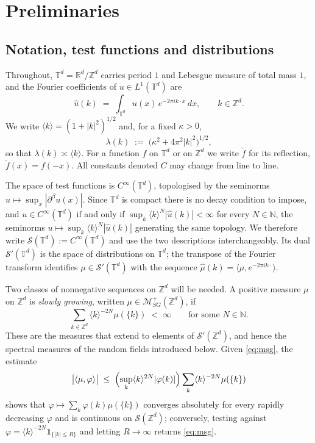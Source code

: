 \documentclass[pdflatex,sn-mathphys,Numbered]{sn-jnl}
\theoremstyle{thmstyleone}%
\theoremstyle{thmstyletwo}%
\theoremstyle{thmstylethree}%
\newcommand{\RR}{\mathbb{R}}
\newcommand{\ZZ}{\mathbb{Z}}
\newcommand{\NN}{\mathbb{N}}
\newcommand{\TT}{\mathbb{T}}
\newcommand{\calS}{\mathcal{S}}
\newcommand{\calM}{\mathcal{M}}
\begin{document}
\section{Preliminaries}
\label{sec:preliminaries}

\subsection{Notation, test functions and distributions}

Throughout, $\TT^d = \RR^d/\ZZ^d$ carries period $1$ and Lebesgue measure of
total mass $1$, and the Fourier coefficients of $u \in L^1(\TT^d)$ are
\[
    \hat u(k) \;=\; \int_{\TT^d} u(x)\, e^{-2\pi i k\cdot x}\,dx ,
    \qquad k \in \ZZ^d .
\]
We write $\langle k\rangle = (1+|k|^2)^{1/2}$ and, for a fixed $\kappa>0$,
\begin{equation}\label{eq:lambda}
    \lambda(k) \;:=\; \bigl(\kappa^2 + 4\pi^2|k|^2\bigr)^{1/2} ,
\end{equation}
so that $\lambda(k) \asymp \langle k\rangle$. For a function $f$ on $\TT^d$ or
on $\ZZ^d$ we write $\check f$ for its reflection, $\check f(x) = f(-x)$. All
constants denoted $C$ may change from line to line.

The space of test functions is $C^\infty(\TT^d)$, topologised by the seminorms
$u \mapsto \sup_{x}|\partial^\beta u(x)|$. Since $\TT^d$ is compact there is no
decay condition to impose, and $u \in C^\infty(\TT^d)$ if and only if
$\sup_{k}\langle k\rangle^{N}|\hat u(k)| < \infty$ for every $N \in \NN$, the
seminorms $u \mapsto \sup_k \langle k\rangle^N |\hat u(k)|$ generating the
same topology. We therefore write $\calS(\TT^d) := C^\infty(\TT^d)$ and use the
two descriptions interchangeably. Its dual $\calS'(\TT^d)$ is the space of
distributions on $\TT^d$; the transpose of the Fourier transform identifies
$\mu \in \calS'(\TT^d)$ with the sequence $\hat\mu(k) = \langle \mu,
e^{-2\pi i k\cdot}\rangle$.

Two classes of nonnegative sequences on $\ZZ^d$ will be needed. A positive
measure $\mu$ on $\ZZ^d$ is \emph{slowly growing}, written
$\mu \in \calM_{SG}^+(\ZZ^d)$, if
\begin{equation}\label{eq:msg}
    \sum_{k \in \ZZ^d} \langle k\rangle^{-2N} \mu(\{k\}) \;<\; \infty
    \qquad \text{for some } N \in \NN .
\end{equation}
These are the measures that extend to elements of $\calS'(\ZZ^d)$, and
hence the spectral measures of the random fields introduced below.
Given \eqref{eq:msg}, the estimate
\[
    \bigl|\langle \mu,\varphi\rangle\bigr|
    \;\leq\; \Bigl(\sup_k \langle k\rangle^{2N}|\varphi(k)|\Bigr)
             \sum_{k}\langle k\rangle^{-2N}\mu(\{k\})
\]
shows that $\varphi \mapsto \sum_k \varphi(k)\mu(\{k\})$ converges absolutely
for every rapidly decreasing $\varphi$ and is continuous on $\calS(\ZZ^d)$;
conversely, testing against
$\varphi = \langle k\rangle^{-2N}\mathbf{1}_{\{|k| \leq R\}}$ and letting
$R \to \infty$ returns \eqref{eq:msg}.
\end{document}
